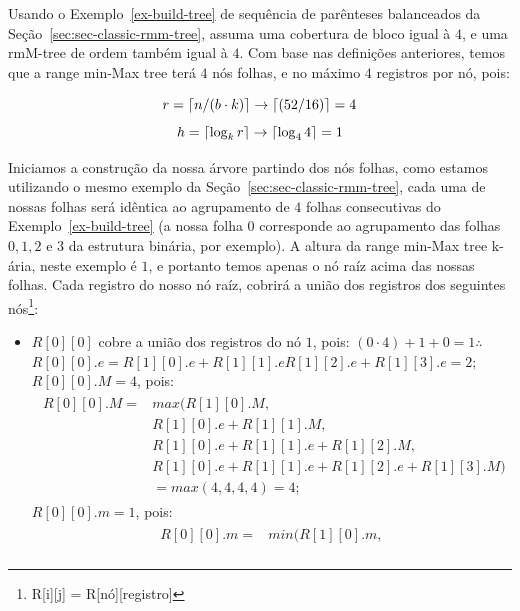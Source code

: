 \begin{example}
    Usando o Exemplo~\ref{ex-build-tree} de sequência de parênteses balanceados da Seção~\ref{sec:sec-classic-rmm-tree}, assuma uma cobertura de bloco igual à $4$, e uma rmM-tree de  ordem também igual à $4$.  Com base nas definições anteriores, temos que a range min-Max tree terá $4$ nós folhas, e no máximo $4$ registros por nó, pois:

    $$r = \lceil n/(b \cdot k)\rceil \to \lceil(52/16)\rceil = 4$$
    $$h = \lceil\log_k r\rceil \to \lceil\log_4 4\rceil = 1 $$
        
        Iniciamos a construção da nossa árvore partindo dos nós folhas, como estamos utilizando o mesmo exemplo da Seção~\ref{sec:sec-classic-rmm-tree}, cada uma de nossas folhas será idêntica ao agrupamento de $4$ folhas consecutivas do Exemplo~\ref{ex-build-tree} (a nossa folha $0$ corresponde ao agrupamento das folhas $0,1,2 \mbox{ e } 3$ da estrutura binária, por exemplo). A altura da range min-Max tree k-ária, neste exemplo é $1$, e portanto temos apenas o nó raíz acima das nossas folhas. Cada registro do nosso nó raíz, cobrirá a união dos registros dos seguintes nós\footnote{R[i][j] = R[nó][registro]}:
        \begin{itemize}
            \item $R[0][0]$ cobre a união dos registros do nó $1$, pois: $(0 \cdot 4) +1 + 0=1 \therefore$ \\
            $R[0][0].e = R[1][0].e + R[1][1].e R[1][2].e + R[1][3].e = 2$;\\
            $R[0][0].M = 4$, pois:\\
            \begin{eqnarray*}
                \begin{split}
                    R[0][0].M =& max(R[1][0].M, \\
                    &   R[1][0].e + R[1][1].M, \\
                    &   R[1][0].e + R[1][1].e + R[1][2].M,  \\
                    &   R[1][0].e + R[1][1].e + R[1][2].e + R[1][3].M)\\
                    &   = max(4,4,4,4) = 4;
                \end{split}
            \end{eqnarray*}
            $R[0][0].m = 1$, pois:
                \begin{eqnarray*}
                    \begin{split}
                        R[0][0].m =& min(R[1][0].m, \\

\end{split}
\end{eqnarray*}
\end{itemize}
\end{example}
